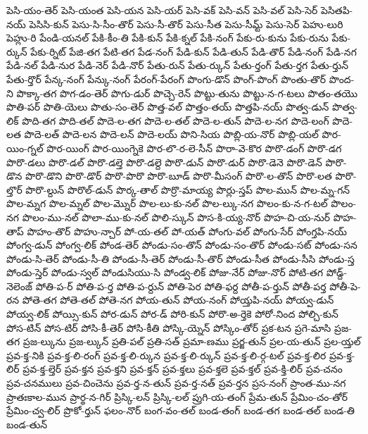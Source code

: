 {పెసి-యం-తెర్
పెసి-యంత
పెసి-యన
పెసి-యర్
పెసి-వక్
పెసి-వన్
పెసి-వల్
పెసి-సెర్
పెసితపి-నయ్
పెసిసి-కున్
పెసు-సి-సీం-తొర్
పెసు-సీ-తొర్
పెసు-సీత
పెసు-సీమ్ట్
పెసు-సెర్
పెహు-లురి
పెహ్లు-రి
పేండి-యనల్
పేకి-కీం-తి
పేకి-కున్
పేకి-క్నల్
పేకి-నంగ్
పేకు-రు-కును
పేకు-రును
పేకు-ర్కున్
పేకు-ర్నిట్
పేజి-తగ
పేటి-తగ
పేడ-నంగ్
పేడి-కున్
పేడి-తున్
పేడి-తొర్
పేడి-నంగ్
పేడి-నగ
పేడి-నల్
పేడి-నుర
పేడి-నెర్
పేడి-నొర్
పేతు-రున్
పేతు-ర్కున్
పేతు-ర్తంగ్
పేతు-ర్తగ
పేతు-ర్తున్
పేతు-ర్తొర్
పేన్క-నంగ్
పేన్కు-నంగ్
పేరంగ్-పేరంగ్
పొంగు-డొన్
పొంగ్-పొంగ్
పొంతు-తొర్
పొంద-ని
పొక్కా-తగ
పొగ-డం-తెర్
పొగు-డుర్
పొచ్చె-రెన్
పొట్టు-తును
పొట్టు-న-గ-టలు
పొతం-తయొ
పొతి-పర్
పొతి-యెలు
పొతు-సం-తెర్
పొత్త-వల్
పొత్తం-తయ్
పొత్తపి-నయ్
పొత్వ-డున్
పొత్వ-లిక్
పొది-తగ
పొది-తల్
పొదె-ల-తగ
పొదె-ల-తల్
పొదె-ల-తున్
పొదె-ల-నగ
పొదె-లంగ్
పొదె-లత
పొదె-లత్
పొదె-లన
పొదె-లన్
పొదె-లయ్
పొని-సియ
పొబ్లి-య-నొర్
పొబ్లి-యల్
పొర-యిం-గ్నల్
పొర-యింగ్
పొర-యింగ్నెకె
పొర-లొ-ర-లె-సీన్
పొరా-వె-కొర
పొరొ-డంగ్
పొరొ-డగ
పొరొ-డలు
పొరొ-డల్
పొరొ-డల్తె
పొరొ-డల్దె
పొరొ-డున్
పొరొ-డుర్
పొరొ-డెనె
పొరొ-డెన్
పొరొ-డొన
పొరొ-డొని
పొరొ-డొర్
పొరొ-పొరొ
పొరొ-బూడ్
పొరొ-మీసంగ్
పొరొ-ల-తొన్
పొరొ-లత
పొరొ-ల్తొర్
పొరొ-ల్దున్
పొరొల్-డున్
పొర్క-తాల్
పొర్రొ-మాయ్య
పొర్లు-స్తప్
పొల-మున్
పొల-మ్న-గన్
పొల-మ్నగ
పొల-మ్నల్
పొల-మ్నొర్
పొల-లు-కు-నల్
పొల-ల్కు-నగ
పొలం-కు-న-గ-టల్
పొలం-నగ
పొలం-ము-నల్
పొలా-ము-కు-నల్
పొలి-స్కున్
పొస-కి-య్య-నొర్
పొహ-చి-య-నుర్
పొహ-తాప్
పొహం-తొర్
పొహు-న్చార్
పో-య-తల్
పో-యత్
పోంగు-వల్
పోంగు-సేర్
పోంగ్తపి-నయ్
పోంగ్వ-డున్
పోంగ్వ-లిక్
పోండ-తెర్
పోండు-సం-తొన్
పోండు-సం-తొర్
పోండు-సట్
పోండు-సన
పోండు-సి-తెర్
పోండు-సీ-తి
పోండు-సీ-తెర్
పోండు-సీ-తొర్
పోండు-సీత
పోండు-సీసి
పోండు-స్త
పోండు-స్తెర్
పోండు-స్వల్
పోండుసియు-సి
పోండ్వ-లిక్
పోజు-నేర్
పోజు-నొర్
పోటి-తగ
పోడ్ద్-నెలెంజ్
పోతి-ప-ర్
పోతి-ప-ర్త
పోతి-ప-ర్దున్
పోతి-పెర
పోతి-ఫర్ద
పోతీ-ప-ర్తున్
పోతీ-పర్త
పోతీ-పె-రన
పోతె-తగ
పోతె-తల్
పోతె-నగ
పోయ-తున్
పోయ-నంగ్
పోయ్తపి-నయ్
పోయ్వ-డున్
పోయ్వ-లిక్
పోయ్సి-కున్
పోర-డున్
పోర-డ్
పోరి-కున్
పోరొ-అ-ర్తెకె
పోరో-నింద
పోల్చి-కున్
పోస-టిన్
పోస-టిర్
పోసి-కీ-తెర్
పోసి-కీతి
పోస్కి-య్నెన్
పోస్కిం-తోర్
ప్రక-టన
ప్రగె-మాసి
ప్రజ-తగ
ప్రజ-ల్కును
ప్రజ-ల్కున్
ప్రతి-పల్
ప్రతి-సత్
ప్రమా-ణము
ప్రర్జ-తున్
ప్రల-య-తున్
ప్రల-య్తల్
ప్రవ-క్త-నికి
ప్రవ-క్త-లి-రంగ్
ప్రవ-క్త-లి-ర్కున
ప్రవ-క్త-లి-ర్కున్
ప్రవ-క్త-లి-ర్గ-టల్
ప్రవ-క్త-లిర
ప్రవ-క్త-లిర్
ప్రవ-క్త-ల్తెర్
ప్రవ-క్తన
ప్రవ-క్తని
ప్రవ-క్తన్
ప్రవ-క్తలు
ప్రవ-క్తలె
ప్రవ-క్తల్
ప్రవ-క్తి-లిర్
ప్రవ-చనం
ప్రవ-చనములు
ప్రవ-చించెను
ప్రవ-ర్త-న-తున్
ప్రవ-ర్త-నత్
ప్రవ-ర్తన
ప్రస-నంగ్
ప్రాంత-ము-నగ
ప్రాతఃకాల-మున
ప్రార్థ-న-గిర్
ప్రిస్కి-లన్
ప్రిస్కి-లల్
ప్రుగి-య-తంగ్
ప్రేమ-తున్
ప్రేమిం-చం-తోర్
ప్రేమిం-చ్వ-లిర్
ప్రొకో-ర్తున్
ఫలం-నొర్
బంగ-వం-తల్
బండ-తంగ్
బండ-తగ
బండ-తల్
బండ-తి
బండ-తున్
}
